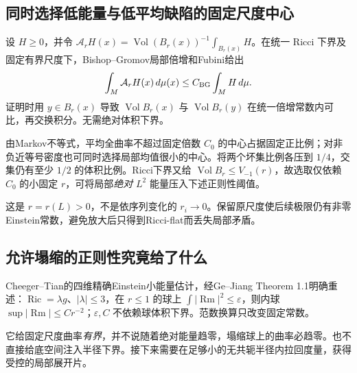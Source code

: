 \documentclass[UTF8,a4paper,11pt,fontset=fandol]{ctexart}
\numberwithin{equation}{section}
\theoremstyle{definition}
\newcommand{\Ric}{\operatorname{Ric}}
\newcommand{\Rm}{\operatorname{Rm}}
\newcommand{\Vol}{\operatorname{Vol}}
\begin{document}
\subsection{同时选择低能量与低平均缺陷的固定尺度中心}
设 $H\ge0$，并令 $\mathcal A_rH(x)=\Vol(B_r(x))^{-1}\int_{B_r(x)}H$。在统一 Ricci 下界及固定有界尺度下，Bishop--Gromov局部倍增和Fubini给出
\begin{equation}\label{eq:fubini}
 \int_M\mathcal A_rH(x)\,d\mu(x)\le C_{\rm BG}\int_MH\,d\mu.
\end{equation}
证明时用 $y\in B_r(x)$ 导致 $\Vol B_r(x)$ 与 $\Vol B_r(y)$ 在统一倍增常数内可比，再交换积分。无需绝对体积下界。

由Markov不等式，平均全曲率不超过固定倍数 $C_0$ 的中心占据固定正比例；对非负近等号密度也可同时选择局部均值很小的中心。将两个坏集比例各压到 $1/4$，交集仍有至少 $1/2$ 的体积比例。Ricci下界又给 $\Vol B_r\le V_{-1}(r)$，故选取仅依赖 $C_0$ 的小固定 $r$，可将局部\emph{绝对} $L^2$ 能量压入下述正则性阈值。

这是 $r=r(L)>0$，不是依序列变化的 $r_i\to0$。保留原尺度使后续极限仍有非零Einstein常数，避免放大后只得到Ricci-flat而丢失局部矛盾。

\subsection{允许塌缩的正则性究竟给了什么}
Cheeger--Tian的四维精确Einstein小能量估计，经Ge--Jiang Theorem 1.1明确重述：$\Ric=\lambda g$、$|\lambda|\le3$，在 $r\le1$ 的球上 $\int|\Rm|^2\le\varepsilon$，则内球 $\sup|\Rm|\le Cr^{-2}$；$\varepsilon,C$ 不依赖球体积下界\cite{CT2006,GJ2017}。范数换算只改变固定常数。

它给固定尺度曲率\emph{有界}，并不说随着绝对能量趋零，塌缩球上的曲率必趋零。也不直接给底空间注入半径下界。接下来需要在足够小的无共轭半径内拉回度量，获得受控的局部展开片。
\end{document}
